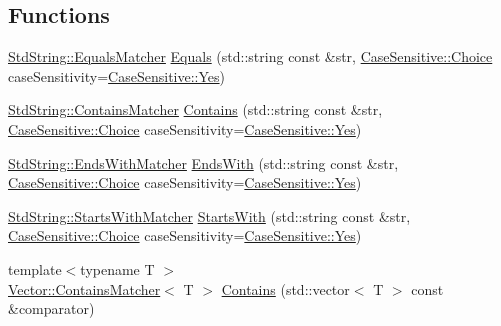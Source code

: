 \subsection*{Functions}
\begin{DoxyCompactItemize}
\item 
\mbox{\hyperlink{structCatch_1_1Matchers_1_1StdString_1_1EqualsMatcher}{Std\+String\+::\+Equals\+Matcher}} \mbox{\hyperlink{namespaceCatch_1_1Matchers_af8af7dfc338335ed4c788cb1b37fc59f}{Equals}} (std\+::string const \&str, \mbox{\hyperlink{structCatch_1_1CaseSensitive_aad49d3aee2d97066642fffa919685c6a}{Case\+Sensitive\+::\+Choice}} case\+Sensitivity=\mbox{\hyperlink{structCatch_1_1CaseSensitive_aad49d3aee2d97066642fffa919685c6aa7c5550b69ec3c502e6f609b67f9613c6}{Case\+Sensitive\+::\+Yes}})
\item 
\mbox{\hyperlink{structCatch_1_1Matchers_1_1StdString_1_1ContainsMatcher}{Std\+String\+::\+Contains\+Matcher}} \mbox{\hyperlink{namespaceCatch_1_1Matchers_a1f6c2accdc6cd75a84d7112dcad647b4}{Contains}} (std\+::string const \&str, \mbox{\hyperlink{structCatch_1_1CaseSensitive_aad49d3aee2d97066642fffa919685c6a}{Case\+Sensitive\+::\+Choice}} case\+Sensitivity=\mbox{\hyperlink{structCatch_1_1CaseSensitive_aad49d3aee2d97066642fffa919685c6aa7c5550b69ec3c502e6f609b67f9613c6}{Case\+Sensitive\+::\+Yes}})
\item 
\mbox{\hyperlink{structCatch_1_1Matchers_1_1StdString_1_1EndsWithMatcher}{Std\+String\+::\+Ends\+With\+Matcher}} \mbox{\hyperlink{namespaceCatch_1_1Matchers_ae5a45efb4538c57c43e04f3f9043ad6e}{Ends\+With}} (std\+::string const \&str, \mbox{\hyperlink{structCatch_1_1CaseSensitive_aad49d3aee2d97066642fffa919685c6a}{Case\+Sensitive\+::\+Choice}} case\+Sensitivity=\mbox{\hyperlink{structCatch_1_1CaseSensitive_aad49d3aee2d97066642fffa919685c6aa7c5550b69ec3c502e6f609b67f9613c6}{Case\+Sensitive\+::\+Yes}})
\item 
\mbox{\hyperlink{structCatch_1_1Matchers_1_1StdString_1_1StartsWithMatcher}{Std\+String\+::\+Starts\+With\+Matcher}} \mbox{\hyperlink{namespaceCatch_1_1Matchers_a97c9ee09a70378ca7e8c6f9f01b0d6d1}{Starts\+With}} (std\+::string const \&str, \mbox{\hyperlink{structCatch_1_1CaseSensitive_aad49d3aee2d97066642fffa919685c6a}{Case\+Sensitive\+::\+Choice}} case\+Sensitivity=\mbox{\hyperlink{structCatch_1_1CaseSensitive_aad49d3aee2d97066642fffa919685c6aa7c5550b69ec3c502e6f609b67f9613c6}{Case\+Sensitive\+::\+Yes}})
\item 
{\footnotesize template$<$typename T $>$ }\\\mbox{\hyperlink{structCatch_1_1Matchers_1_1Vector_1_1ContainsMatcher}{Vector\+::\+Contains\+Matcher}}$<$ T $>$ \mbox{\hyperlink{namespaceCatch_1_1Matchers_a4b3621740dc515216ad31ab827d4092c}{Contains}} (std\+::vector$<$ T $>$ const \&comparator)

\end{DoxyCompactItemize}

